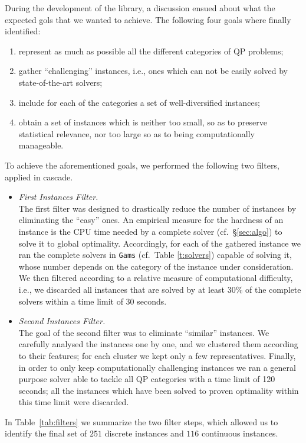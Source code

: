 During the development of the library, a discussion ensued about what
the expected gols that we wanted to achieve. The following four goals
where finally identified:
%
\begin{enumerate}
 \item represent as much as possible all the different categories of QP
       problems;
 \item gather ``challenging'' instances, i.e., ones which can not be easily
       solved by  state-of-the-art solvers;
 \item include for each of the categories a set of well-diversified
       instances;
 \item obtain a set of instances which is neither too small, so as to
       preserve statistical relevance, nor too large so as to being
       computationally manageable.
\end{enumerate}
%
To achieve the aforementioned goals, we performed the following two
filters, applied in cascade.
%
\begin{itemize}
 \item \emph{First Instances Filter.}\\
       The first filter was designed to drastically reduce the number of
       instances by eliminating the ``easy'' ones. An empirical measure
       for the hardness of an instance is the CPU time needed by a
       complete solver (cf.~\S \ref{sec:algo}) to solve it to
       global optimality. Accordingly, for each of the gathered instance we
       ran the complete solvers in {\tt Gams} (cf.~Table \ref{t:solvers})
       capable of solving it, whose number depends on the category of the
       instance under consideration. We then filtered according to a relative
       measure of computational difficulty, i.e., we discarded all instances
       that are solved by at least 30\% of the complete solvers within a time
       limit of 30 seconds.
 \item \emph{Second Instances Filter.}\\
       The goal of the second filter was to eliminate ``similar'' instances.
       We carefully analysed the instances one by one, and we clustered them
       according to their features; for each cluster we kept only a few
       representatives. Finally, in order to only keep computationally
       challenging instances we ran a general purpose solver able to tackle
       all QP categories with a time limit of 120 seconds; all the instances
       which have been solved to proven optimality within this time limit were
       discarded.
\end{itemize}
%
In Table~\ref{tab:filters} we summarize the two filter steps, which
allowed us to identify the final set of $251$ discrete instances and
$116$ continuous instances.

